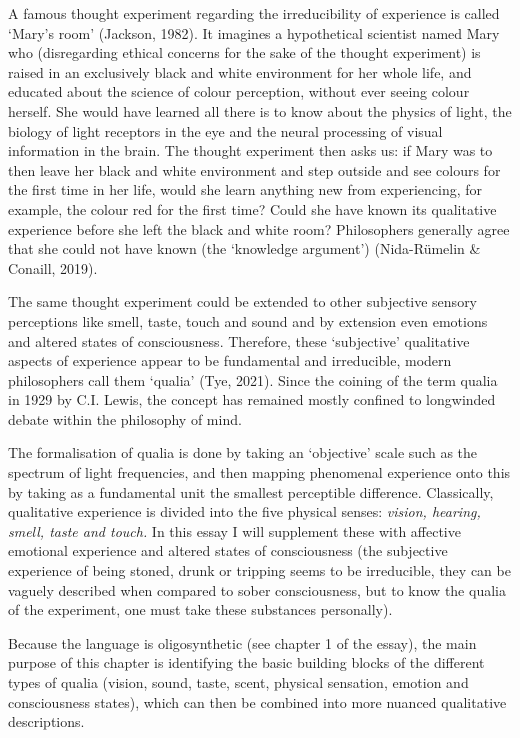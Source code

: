 A famous thought experiment regarding the irreducibility of experience is called ‘Mary’s room’ (Jackson, 1982). It imagines a hypothetical scientist named Mary who (disregarding ethical concerns for the sake of the thought experiment) is raised in an exclusively black and white environment for her whole life, and educated about the science of colour perception, without ever seeing colour herself. She would have learned all there is to know about the physics of light, the biology of light receptors in the eye and the neural processing of visual information in the brain. The thought experiment then asks us: if Mary was to then leave her black and white environment and step outside and see colours for the first time in her life, would she learn anything new from experiencing, for example, the colour red for the first time? Could she have known its qualitative experience before she left the black and white room? Philosophers generally agree that she could not have known (the ‘knowledge argument’) (Nida-Rümelin \& Conaill, 2019). 

The same thought experiment could be extended to other subjective sensory perceptions like smell, taste, touch and sound and by extension even emotions and altered states of consciousness. Therefore, these ‘subjective’ qualitative aspects of experience appear to be fundamental and irreducible, modern philosophers call them ‘qualia’ (Tye, 2021). Since the coining of the term qualia in 1929 by C.I. Lewis, the concept has remained mostly confined to longwinded debate within the philosophy of mind.  

The formalisation of qualia is done by taking an ‘objective’ scale such as the spectrum of light frequencies, and then mapping phenomenal experience onto this by taking as a fundamental unit the smallest perceptible difference. Classically, qualitative experience is divided into the five physical senses: \textit{vision, hearing, smell, taste and touch.} In this essay I will supplement these with affective emotional experience and altered states of consciousness (the subjective experience of being stoned, drunk or tripping seems to be irreducible, they can be vaguely described when compared to sober consciousness, but to know the qualia of the experiment, one must take these substances personally). 

Because the language is oligosynthetic (see chapter 1 of the essay), the main purpose of this chapter is identifying the basic building blocks of the different types of qualia (vision, sound, taste, scent, physical sensation, emotion and consciousness states), which can then be combined into more nuanced qualitative descriptions.

